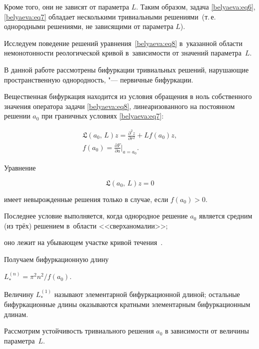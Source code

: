 Кроме того, они не зависят от параметра $L$. Таким образом, задача \eqref{belyaeva:eq6}, \eqref{belyaeva:eq7} обладает несколькими тривиальными решениями~(т.\,е. однородными решениями, не зависящими от параметра $L$). 

Исследуем поведение решений уравнения~\eqref{belyaeva:eq8} в~указанной области немонотонности реологической кривой в~зависимости от значений параметра~$L$.



В данной работе рассмотрены бифуркации тривиальных решений, нарушающие пространственную однородность, "--- первичные бифуркации.  

Вещественная бифуркация находится из условия обращения в ноль собственного значения оператора задачи \eqref{belyaeva:eq8}, линеаризованного на постоянном решении $a_0$ при граничных условиях \eqref{belyaeva:eq7}:

\begin{gather}

\label{belyaeva:lin:op} {\mathfrak{L}}(a_0,\,L)z=\frac{\partial ^2

z}{\partial r^2} +Lf(a_0)z,\\

f(a_0)=\frac{\partial F}{\partial a} \Big|_{a=a_0}.

\end{gather}

Уравнение

\begin{equation*}

{\mathfrak{L}}(a_0,\,L)z=0

\end{equation*}

имеет невырожденные решения только в случае, если $f(a_0)>0$. 

Последнее условие выполняется,  когда однородное решение $a_0$ является средним (из трёх) решением в~области <<сверханомалии>>;

оно лежит на убывающем участке кривой течения~\cite{Hud}. 

Получаем бифуркационную длину

$

L_*^{(n)} ={\pi^2 n^2 }/{f(a_0)}.

$

Величину $L_*^{(1)}$ называют элементарной бифуркационной длиной; остальные бифуркационные длины оказываются кратными элементарным бифуркационным длинам.



Рассмотрим устойчивость тривиального решения $a_0$ в зависимости от величины параметра~$L$. 


